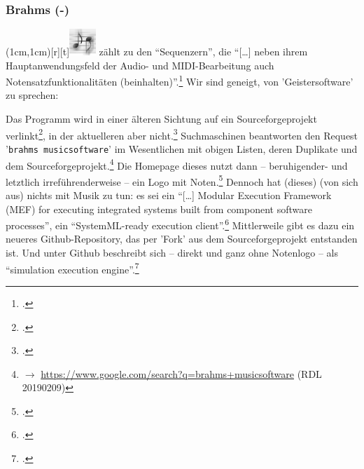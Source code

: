%
%
%



\subsubsection{Brahms (-)}

\parpic(1cm,1cm)[r][t]{\includegraphics[width=1cm]{logos/brahms-300dpi.png}}
\label{Brahms} zählt  zu den \enquote{Sequenzern},
die \enquote{[\ldots] neben ihrem Hauptanwendungsfeld der Audio- und
MIDI-Bearbeitung auch Notensatzfunktionalitäten
(beinhalten)}.\footcite[vgl.][\nopage wp]{WpedNotensatz2019a} Wir sind geneigt,
von 'Geistersoftware' zu sprechen:

Das Programm  wird in einer älteren Sichtung auf ein
Sourceforgeprojekt verlinkt\footcite[vgl.][\nopage wp]{Callon2009a}, in der
aktuelleren aber nicht.\footcite[vgl.][\nopage wp]{WpedNotensatz2019a}
Suchmaschinen beantworten den Request '\texttt{brahms musicsoftware}' im
Wesentlichen mit obigen Listen, deren Duplikate und dem
Sourceforgeprojekt.\footnote{$\rightarrow$
\href{https://www.google.com/search?q=brahms+musicsoftware}
{https://www.google.com/search?q=brahms+musicsoftware} (RDL 20190209)} Die
Homepage dieses  nutzt dann -- beruhigender-
und letztlich irreführenderweise -- ein Logo mit Noten.\footcite[vgl.][\nopage
wp]{Brahms2013a} Dennoch hat (dieses)  (von sich aus) nichts mit
Musik zu tun: es sei ein \enquote{[\ldots] Modular Execution Framework (MEF) for
executing integrated systems built from component software processes}, ein
\enquote{SystemML-ready execution client}.\footcite[vgl.][\nopage
wp]{Brahms2013b} Mittlerweile gibt es dazu ein neueres Github-Repository, das
per 'Fork' aus dem Sourceforgeprojekt entstanden ist. Und unter Github
beschreibt sich  -- direkt und ganz ohne Notenlogo -- als
\enquote{simulation execution engine}.\footcite[vgl.][\nopage wp]{Brahms2018a}

